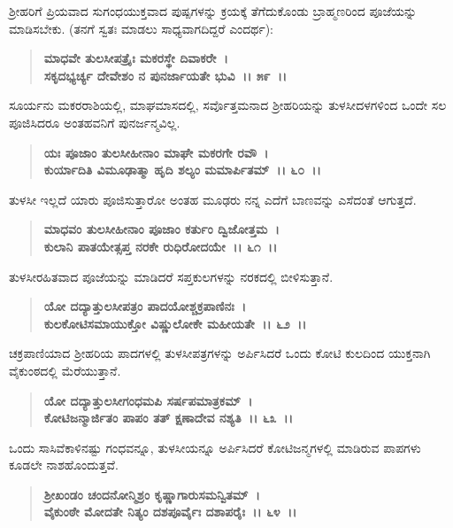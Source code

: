 ಶ‍್ರೀಹರಿಗೆ ಪ್ರಿಯವಾದ ಸುಗಂಧಯುಕ್ತವಾದ ಪುಷ್ಪಗಳನ್ನು ಕ್ರಯಕ್ಕೆ ತೆಗೆದುಕೊಂಡು ಬ್ರಾಹ್ಮಣರಿಂದ ಪೂಜೆಯನ್ನು ಮಾಡಿಸಬೇಕು. (ತನಗೆ ಸ್ವತಃ ಮಾಡಲು ಸಾಧ್ಯವಾಗದಿದ್ದರೆ ಎಂದರ್ಥ):

\begin{verse}
\textbf{ಮಾಧವೇ ತುಲಸೀಪತ್ರೈಃ ಮಕರಸ್ಥೇ ದಿವಾಕರೇ~।}\\\textbf{ಸಕೃದಭ್ಯರ್ಚ್ಯ ದೇವೇಶಂ ನ ಪುನರ್ಜಾಯತೇ ಭುವಿ~।। ೫೯~।।}
\end{verse}

ಸೂರ್ಯನು ಮಕರರಾಶಿಯಲ್ಲಿ, ಮಾಘಮಾಸದಲ್ಲಿ, ಸರ್ವೊತ್ತಮನಾದ ಶ‍್ರೀಹರಿಯನ್ನು ತುಳಸೀದಳಗಳಿಂದ ಒಂದೇ ಸಲ ಪೂಜಿಸಿದರೂ ಅಂತಹವನಿಗೆ ಪುನರ್ಜನ್ಮವಿಲ್ಲ.

\begin{verse}
\textbf{ಯಃ ಪೂಜಾಂ ತುಲಸೀಹೀನಾಂ ಮಾಘೇ ಮಕರಗೇ ರವೌ~।}\\\textbf{ಕುರ್ಯಾದಿತಿ ವಿಮೂಢಾತ್ಮಾ ಹೃದಿ ಶಲ್ಯಂ ಮಮಾರ್ಪಿತಮ್~।। ೬೦~।।}
\end{verse}

ತುಳಸೀ ಇಲ್ಲದೆ ಯಾರು ಪೂಜಿಸುತ್ತಾರೋ ಅಂತಹ ಮೂಢರು ನನ್ನ ಎದೆಗೆ ಬಾಣವನ್ನು ಎಸೆದಂತೆ ಆಗುತ್ತದೆ.

\begin{verse}
\textbf{ಮಾಧವಂ ತುಲಸೀಹೀನಾಂ ಪೂಜಾಂ ಕರ್ತುಂ ದ್ವಿಜೋತ್ತಮ~।}\\\textbf{ಕುಲಾನಿ ಪಾತಯೇತ್ಸಪ್ತ ನರಕೇ ರುಧಿರೋದಯೇ~।। ೬೧~।।}
\end{verse}

ತುಳಸೀರಹಿತವಾದ ಪೂಜೆಯನ್ನು ಮಾಡಿದರೆ ಸಪ್ತಕುಲಗಳನ್ನು ನರಕದಲ್ಲಿ ಬೀಳಿಸುತ್ತಾನೆ.

\begin{verse}
\textbf{ಯೋ ದದ್ಯಾತ್ತುಲಸೀಪತ್ರಂ ಪಾದಯೋಶ್ಚಕ್ರಪಾಣಿನಃ~।}\\\textbf{ಕುಲಕೋಟಿಸಮಾಯುಕ್ತೋ ವಿಷ್ಣುಲೋಕೇ ಮಹೀಯತೇ~।। ೬೨~।। }
\end{verse}

ಚಕ್ರಪಾಣಿಯಾದ ಶ‍್ರೀಹರಿಯ ಪಾದಗಳಲ್ಲಿ ತುಳಸೀಪತ್ರಗಳನ್ನು ಅರ್ಪಿಸಿದರೆ ಒಂದು ಕೋಟಿ ಕುಲದಿಂದ ಯುಕ್ತನಾಗಿ ವೈಕುಂಠದಲ್ಲಿ ಮೆರೆಯುತ್ತಾನೆ.

\begin{verse}
\textbf{ಯೋ ದದ್ಯಾತ್ತುಲಸೀಗಂಧಮಪಿ ಸರ್ಷಪಮಾತ್ರಕಮ್~।}\\\textbf{ಕೋಟಿಜನ್ಮಾರ್ಜಿತಂ ಪಾಪಂ ತತ್ ಕ್ಷಣಾದೇವ ನಶ್ಯತಿ~।। ೬೩~।।}
\end{verse}

ಒಂದು ಸಾಸಿವೆಕಾಳಿನಷ್ಟು ಗಂಧವನ್ನೂ, ತುಳಸೀಯನ್ನೂ ಅರ್ಪಿಸಿದರೆ ಕೋಟಿಜನ್ಮಗಳಲ್ಲಿ ಮಾಡಿರುವ ಪಾಪಗಳು ಕೂಡಲೇ ನಾಶಹೊಂದುತ್ತವೆ.

\begin{verse}
\textbf{ಶ‍್ರೀಖಂಡಂ ಚಂದನೋನ್ಮಿಶ್ರಂ ಕೃಷ್ಣಾಗಾರುಸಮನ್ವಿತಮ್~।}\\\textbf{ವೈಕುಂಠೇ ಮೋದತೇ ನಿತ್ಯಂ ದಶಪೂರ್ವೈಃ ದಶಾಪರೈಃ~।। ೬೪~।।}
\end{verse}

